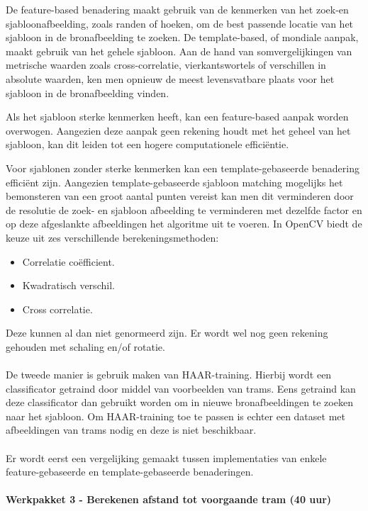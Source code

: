 \documentclass[a4paper,oneside,11pt,final]{memoir}
\begin{document}
De feature-based benadering maakt gebruik van de kenmerken van het zoek-en sjabloonafbeelding, zoals randen of hoeken, om de best passende locatie van het sjabloon in de bronafbeelding te zoeken.
De template-based, of mondiale aanpak, maakt gebruik van het gehele sjabloon.
Aan de hand van somvergelijkingen van metrische waarden zoals cross-correlatie, vierkantswortels of 
verschillen in absolute waarden, ken men opnieuw de meest levensvatbare plaats voor het sjabloon in de bronafbeelding vinden.
 
Als het sjabloon sterke kenmerken heeft, kan een feature-based aanpak worden overwogen. Aangezien deze aanpak geen rekening houdt met het geheel van het sjabloon, kan dit leiden tot een hogere computationele efficiëntie.

Voor sjablonen zonder sterke kenmerken kan een template-gebaseerde benadering efficiënt zijn. Aangezien template-gebaseerde sjabloon matching mogelijks het bemonsteren van een groot aantal punten vereist kan men dit verminderen door de resolutie de zoek- en sjabloon afbeelding te verminderen met dezelfde factor en op deze afgeslankte afbeeldingen het algoritme uit te voeren. 
In OpenCV biedt de keuze uit zes verschillende berekeningsmethoden:
\begin{itemize}
\item Correlatie coëfficient.
\item Kwadratisch verschil.
\item Cross correlatie.
\end{itemize}
Deze kunnen al dan niet genormeerd zijn. Er wordt wel nog geen rekening gehouden met schaling en/of rotatie.
\\\\
De tweede manier is gebruik maken van HAAR-training. Hierbij wordt een classificator getraind door middel van voorbeelden van trams. Eens getraind kan deze classificator dan gebruikt worden om in nieuwe bronafbeeldingen te zoeken naar het sjabloon. Om HAAR-training toe te passen is echter een dataset met afbeeldingen van trams nodig en deze is niet beschikbaar.
\\\\
Er wordt eerst een vergelijking gemaakt tussen implementaties van enkele feature-gebaseerde en template-gebaseerde benaderingen.
\paragraph{Werkpakket 3 - Berekenen afstand tot voorgaande tram (40 uur)}
\end{document}
